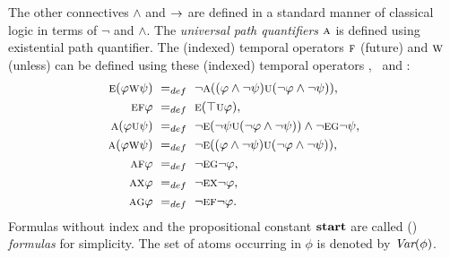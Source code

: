 \documentclass[twoside,11pt]{article}
\begin{document}
The other connectives $\land$ and $\rightarrow$ are defined in a standard manner of classical logic in terms of $\neg$ and $\land$.
The {\em universal  path quantifiers} $\textsc{a}$ is defined using existential path quantifier.
The (indexed) temporal operators $\textsc{f}$ (future) and $\textsc{w}$ (unless) can be defined using these (indexed) temporal operators \NEXT, \UNTIL\ and \GLOBAL:
\begin{align*}
 \textsc{e}(\varphi \textsc{w} \psi)& \ =_{def}\  \neg\textsc{a}((\varphi \wedge \neg \psi) \textsc{u} (\neg \varphi \wedge \neg \psi)),\\
  \textsc{e}\textsc{f} \varphi& \ =_{def}\ \textsc{e}(\top \textsc{u} \varphi),\\
  \textsc{a}(\varphi \textsc{u} \psi)& \ =_{def}\ \neg\textsc{e}(\neg \psi \textsc{u}(\neg \varphi \wedge \neg \psi)) \wedge \neg \textsc{e} \textsc{g} \neg \psi,\\
  \textsc{a}(\varphi \textsc{w} \psi)& \ =_{def}\  \neg\textsc{e}((\varphi \wedge \neg \psi) \textsc{u} (\neg \varphi \wedge \neg \psi)),\\
  \textsc{a}\textsc{f} \varphi& \ =_{def}\  \neg \textsc{e}\textsc{g} \neg \varphi,\\
  \textsc{a} \textsc{x} \varphi& \ =_{def}\  \neg \textsc{e} \textsc{x} \neg \varphi,\\
  \textsc{a} \textsc{g} \varphi& \ =_{def}\  \neg \textsc{e} \textsc{f} \neg \varphi.
\end{align*}
Formulas without index and the propositional constant $\textbf{start}$ are called (\CTL) {\em formulas} for simplicity.
The set of atoms occurring in $\phi$ is denoted by $\textit{Var}(\phi)$.




\end{document}
